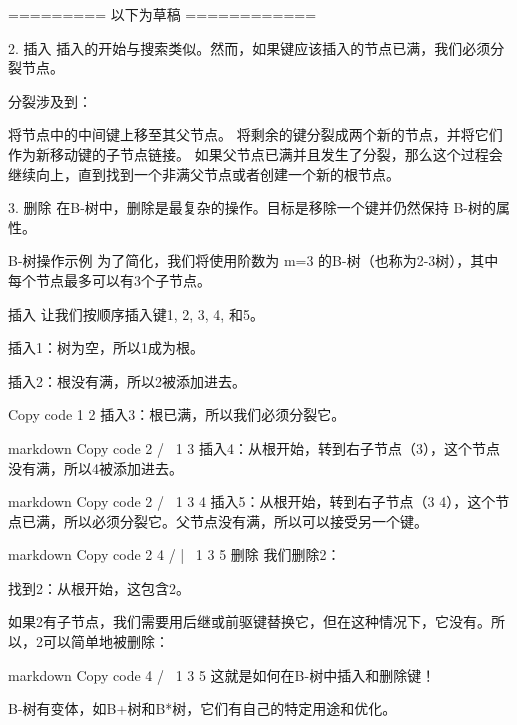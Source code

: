 ========= 以下为草稿 ============


2. 插入
插入的开始与搜索类似。然而，如果键应该插入的节点已满，我们必须分裂节点。

分裂涉及到：

将节点中的中间键上移至其父节点。
将剩余的键分裂成两个新的节点，并将它们作为新移动键的子节点链接。
如果父节点已满并且发生了分裂，那么这个过程会继续向上，直到找到一个非满父节点或者创建一个新的根节点。

3. 删除
在B-树中，删除是最复杂的操作。目标是移除一个键并仍然保持 B-树的属性。

B-树操作示例
为了简化，我们将使用阶数为 m=3 的B-树（也称为2-3树），其中每个节点最多可以有3个子节点。

插入
让我们按顺序插入键1, 2, 3, 4, 和5。

插入1：树为空，所以1成为根。

插入2：根没有满，所以2被添加进去。

Copy code
 1 2
插入3：根已满，所以我们必须分裂它。

markdown
Copy code
     2
   /   \
 1       3
插入4：从根开始，转到右子节点（3），这个节点没有满，所以4被添加进去。

markdown
Copy code
     2
   /   \
 1      3 4
插入5：从根开始，转到右子节点（3 4），这个节点已满，所以必须分裂它。父节点没有满，所以可以接受另一个键。

markdown
Copy code
     2 4
   /   |   \
 1      3    5
删除
我们删除2：

找到2：从根开始，这包含2。

如果2有子节点，我们需要用后继或前驱键替换它，但在这种情况下，它没有。所以，2可以简单地被删除：

markdown
Copy code
     4
   /   \
 1      3 5
这就是如何在B-树中插入和删除键！


B-树有变体，如B+树和B*树，它们有自己的特定用途和优化。